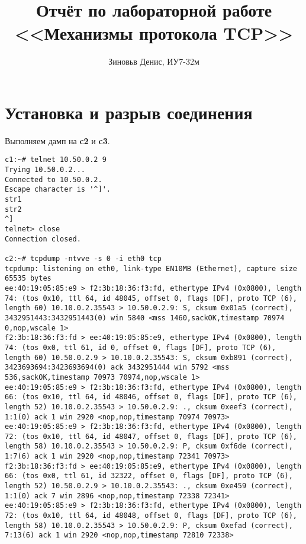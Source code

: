 \documentclass[a4paper,12pt]{article}
\title{Отчёт по лабораторной работе \\ <<Механизмы протокола TCP>>}
\author{Зиновьв Денис, ИУ7-32м}
\begin{document}
\maketitle

\tableofcontents

\section{Установка и разрыв соединения}

Выполняем дамп на \textbf{c2} и \textbf{c3}.

\begin{Verbatim}
c1:~# telnet 10.50.0.2 9
Trying 10.50.0.2...
Connected to 10.50.0.2.
Escape character is '^]'.
str1
str2
^]
telnet> close
Connection closed.

c2:~# tcpdump -ntvve -s 0 -i eth0 tcp
tcpdump: listening on eth0, link-type EN10MB (Ethernet), capture size 65535 bytes
ee:40:19:05:85:e9 > f2:3b:18:36:f3:fd, ethertype IPv4 (0x0800), length 74: (tos 0x10, ttl 64, id 48045, offset 0, flags [DF], proto TCP (6), length 60) 10.10.0.2.35543 > 10.50.0.2.9: S, cksum 0x01a5 (correct), 3432951443:3432951443(0) win 5840 <mss 1460,sackOK,timestamp 70974 0,nop,wscale 1>
f2:3b:18:36:f3:fd > ee:40:19:05:85:e9, ethertype IPv4 (0x0800), length 74: (tos 0x0, ttl 61, id 0, offset 0, flags [DF], proto TCP (6), length 60) 10.50.0.2.9 > 10.10.0.2.35543: S, cksum 0xb891 (correct), 3423693694:3423693694(0) ack 3432951444 win 5792 <mss 536,sackOK,timestamp 70973 70974,nop,wscale 1>
ee:40:19:05:85:e9 > f2:3b:18:36:f3:fd, ethertype IPv4 (0x0800), length 66: (tos 0x10, ttl 64, id 48046, offset 0, flags [DF], proto TCP (6), length 52) 10.10.0.2.35543 > 10.50.0.2.9: ., cksum 0xeef3 (correct), 1:1(0) ack 1 win 2920 <nop,nop,timestamp 70974 70973>
ee:40:19:05:85:e9 > f2:3b:18:36:f3:fd, ethertype IPv4 (0x0800), length 72: (tos 0x10, ttl 64, id 48047, offset 0, flags [DF], proto TCP (6), length 58) 10.10.0.2.35543 > 10.50.0.2.9: P, cksum 0xf6de (correct), 1:7(6) ack 1 win 2920 <nop,nop,timestamp 72341 70973>
f2:3b:18:36:f3:fd > ee:40:19:05:85:e9, ethertype IPv4 (0x0800), length 66: (tos 0x0, ttl 61, id 32322, offset 0, flags [DF], proto TCP (6), length 52) 10.50.0.2.9 > 10.10.0.2.35543: ., cksum 0xe459 (correct), 1:1(0) ack 7 win 2896 <nop,nop,timestamp 72338 72341>
ee:40:19:05:85:e9 > f2:3b:18:36:f3:fd, ethertype IPv4 (0x0800), length 72: (tos 0x10, ttl 64, id 48048, offset 0, flags [DF], proto TCP (6), length 58) 10.10.0.2.35543 > 10.50.0.2.9: P, cksum 0xefad (correct), 7:13(6) ack 1 win 2920 <nop,nop,timestamp 72810 72338>

\end{Verbatim}
\end{document}
